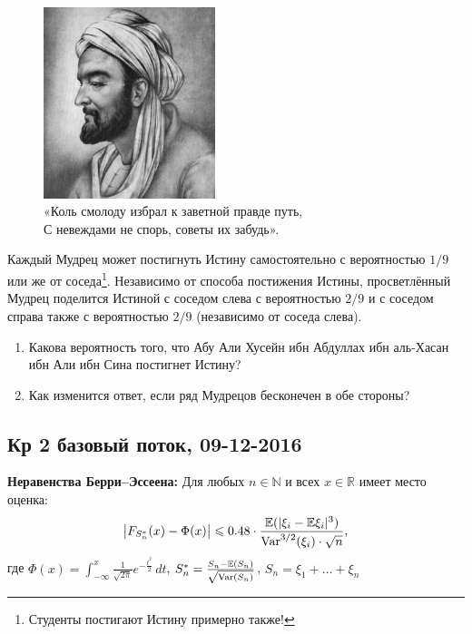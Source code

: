 \documentclass[12pt, a4paper]{article}\usepackage[]{graphicx}\usepackage[]{color}
\begin{document}
\begin{enumerate}
							\begin{figure}[h!]
								\begin{center}
									\includegraphics[width=5cm]{images/abu_ali.jpg}
									\caption*{«Коль смолоду избрал к заветной правде путь, \\
										С невеждами не спорь, советы их забудь». }
								\end{center}
							\end{figure}


							Каждый Мудрец может постигнуть Истину самостоятельно с вероятностью $1/9$ или же от соседа\footnote{Студенты постигают Истину примерно также!}. Независимо от способа постижения Истины, просветлённый Мудрец поделится Истиной с соседом слева с вероятностью $2/9$ и с соседом справа также с вероятностью $2/9$ (независимо от соседа слева).


							\begin{enumerate}
								\item Какова вероятность того, что Абу Али Хусейн ибн Абдуллах ибн аль-Хасан ибн Али ибн Сина постигнет Истину?
								\item Как изменится ответ, если ряд Мудрецов бесконечен в обе стороны?
							\end{enumerate}

						\end{enumerate}


						\subsection{Кр 2 базовый поток, 09-12-2016}


						\textbf{Неравенства Берри–Эссеена:} Для любых $n \in \mathbb{N}$ и всех $x \in \mathbb{R}$ имеет место оценка:
						\[
						\bigl|F_{S_n^{*}}(x) - \Phi(x)\bigr| \leqslant 0.48 \cdot \frac{\mathbb{E}(|\xi_i - \mathbb{E}\xi_i|^3)}{\operatorname{Var}^{3/2}(\xi_i)\cdot\sqrt{n}} \text{,}
						\]
						где $\Phi(x) = \int_{-\infty}^{x}\frac{1}{\sqrt{2\pi}}e^{-\frac{t^2}{2}}\,dt$, \; $S_n^* = \frac{S_n - \mathbb{E}(S_n)}{\sqrt{\operatorname{Var}(S_n)}}$, \; $S_n = \xi_1 + \ldots + \xi_n$
\end{document}
